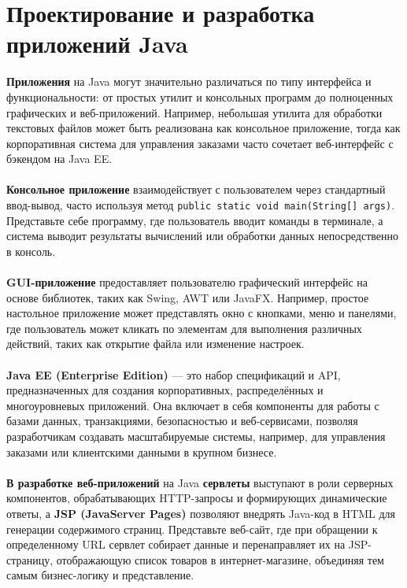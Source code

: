 \documentclass[a4paper, 12pt]{report}
\numberwithin{equation}{section}
\begin{document}
	\section{Проектирование и разработка приложений Java}
	\textbf{Приложения} на Java могут значительно различаться по типу интерфейса и функциональности: от простых утилит и консольных программ до полноценных графических и веб-приложений. Например, небольшая утилита для обработки текстовых файлов может быть реализована как консольное приложение, тогда как корпоративная система для управления заказами часто сочетает веб-интерфейс с бэкендом на Java EE.
	\\\\
	\textbf{Консольное приложение} взаимодействует с пользователем через стандартный ввод-вывод, часто используя метод {\tt public static void main(String[] args)}. Представьте себе программу, где пользователь вводит команды в терминале, а система выводит результаты вычислений или обработки данных непосредственно в консоль.
	\\\\
	\textbf{GUI-приложение} предоставляет пользователю графический интерфейс на основе библиотек, таких как Swing, AWT или JavaFX. Например, простое настольное приложение может представлять окно с кнопками, меню и панелями, где пользователь может кликать по элементам для выполнения различных действий, таких как открытие файла или изменение настроек.
	\\\\
	\textbf{Java EE (Enterprise Edition)} — это набор спецификаций и API, предназначенных для создания корпоративных, распределённых и многоуровневых приложений. Она включает в себя компоненты для работы с базами данных, транзакциями, безопасностью и веб-сервисами, позволяя разработчикам создавать масштабируемые системы, например, для управления заказами или клиентскими данными в крупном бизнесе.
	\\\\
	\textbf{В разработке веб-приложений} на Java \textbf{сервлеты} выступают в роли серверных компонентов, обрабатывающих HTTP-запросы и формирующих динамические ответы, а \textbf{JSP (JavaServer Pages)} позволяют внедрять Java-код в HTML для генерации содержимого страниц. Представьте веб-сайт, где при обращении к определенному URL сервлет собирает данные и перенаправляет их на JSP-страницу, отображающую список товаров в интернет-магазине, объединяя тем самым бизнес-логику и представление.
	\\\\
\end{document}
